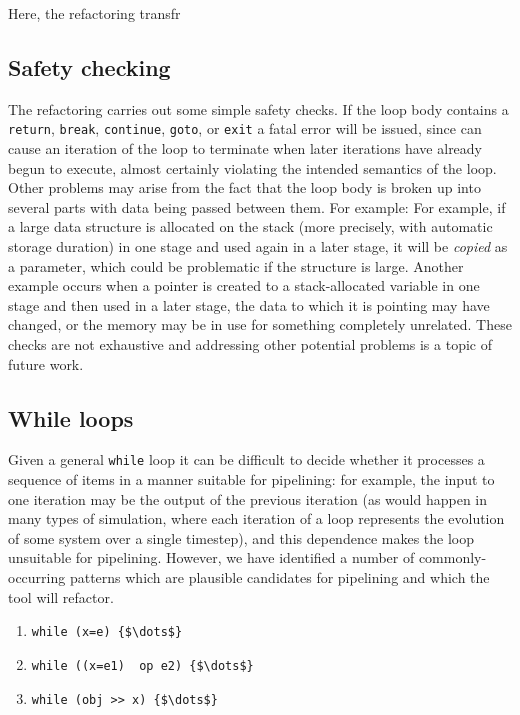 \noindent
Here, the refactoring transfr

\subsection{Safety checking}\label{safety-checking}

The refactoring carries out some simple safety checks. If the loop
body contains a \texttt{return}, \texttt{break}, \texttt{continue},
\texttt{goto}, or \texttt{exit} a fatal error will be issued, since
can cause an iteration of the loop to terminate when later
iterations have already begun to execute, almost certainly violating the
intended semantics of the loop. Other problems may arise from the fact that the loop body is broken up
into several parts with data being passed between them. For example:
% 
  For example, if a large data structure is allocated on the stack (more precisely,
  with automatic storage duration) in one stage and used again in a
  later stage, it will be \emph{copied} as a parameter, which could be
  problematic if the structure is large.
  Another example occurs when a pointer is created to a stack-allocated variable in one stage and
  then used in a later stage, the data to which it is pointing may have
  changed, or the memory may be in use for something completely
  unrelated.
% 
These checks are not exhaustive and addressing other potential problems is a topic of future work.


\subsection{While loops}\label{while-loops}

Given a general \texttt{while} loop it can be
difficult to decide whether it processes a sequence of items in a manner
suitable for pipelining: for example, the input to one iteration may be
the output of the previous iteration (as would happen in many types of
simulation, where each iteration of a loop represents the evolution of
some system over a single timestep), and this dependence makes the loop
unsuitable for pipelining. However, we have identified a number of
commonly-occurring patterns which are plausible candidates for
pipelining and which the tool will refactor.
% 
\begin{enumerate}
\def\labelenumi{\arabic{enumi}.}
\item
  \lstinline[mathescape]|while (x=e) {$\dots$}|
\item
  \lstinline[mathescape]|while ((x=e1)  op e2) {$\dots$}|
\item
  \lstinline[mathescape]|while (obj >> x) {$\dots$}|
\end{enumerate}

